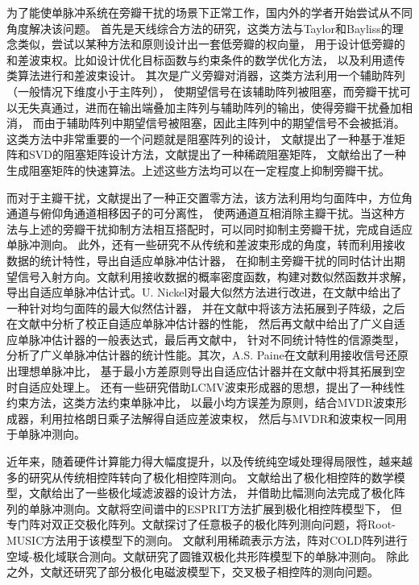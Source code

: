 \documentclass[master]{thesis-uestc}
\begin{document}
为了能使单脉冲系统在旁瓣干扰的场景下正常工作，国内外的学者开始尝试从不同角度解决该问题。
首先是天线综合方法的研究，这类方法与Taylor和Bayliss的理念类似，尝试以某种方法和原则设计出一套低旁瓣的权向量，
用于设计低旁瓣的和差波束权。比如设计优化目标函数与约束条件的数学优化方法，
以及利用遗传类算法进行和差波束设计。
其次是广义旁瓣对消器，这类方法利用一个辅助阵列（一般情况下维度小于主阵列），
使期望信号在该辅助阵列被阻塞，而旁瓣干扰可以无失真通过，进而在输出端叠加主阵列与辅助阵列的输出，使得旁瓣干扰叠加相消，
而由于辅助阵列中期望信号被阻塞，因此主阵列中的期望信号不会被抵消。这类方法中非常重要的一个问题就是阻塞阵列的设计，
文献\cite{Fernández}提出了一种基于准矩阵和SVD的阻塞矩阵设计方法，文献\cite{Markovich}提出了一种稀疏阻塞矩阵，
文献\cite{Dai}给出了一种生成阻塞矩阵的快速算法。上述这些方法均可以在一定程度上抑制旁瓣干扰。

而对于主瓣干扰，文献\cite{Yu_00,Yu_01,Yu_16}提出了一种正交置零方法，该方法利用均匀面阵中，方位角通道与俯仰角通道相移因子的可分离性，
使两通道互相消除主瓣干扰。当这种方法与上述的旁瓣干扰抑制方法相互搭配时，可以同时抑制主旁瓣干扰，完成自适应单脉冲测向。
此外，还有一些研究不从传统和差波束形成的角度，转而利用接收数据的统计特性，导出自适应单脉冲估计器，
在抑制主旁瓣干扰的同时估计出期望信号入射方向。文献\cite{Davis}利用接收数据的概率密度函数，构建对数似然函数并求解，
导出自适应单脉冲估计式。U. Nickel对最大似然方法进行改进，在文献\cite{Nickel_93}中给出了一种针对均匀面阵的最大似然估计器，
并在文献\cite{Nickel_96}中将该方法拓展到子阵级，之后在文献\cite{Nickel_99}中分析了校正自适应单脉冲估计器的性能，
然后再文献\cite{Nickel_06}中给出了广义自适应单脉冲估计器的一般表达式，最后再文献\cite{Nickel_11}中，
针对不同统计特性的信源类型，分析了广义单脉冲估计器的统计性能。其次，A.S. Paine在文献\cite{Paine}利用接收信号还原出理想单脉冲比，
基于最小方差原则导出自适应估计器并在文献\cite{Paine_00}中将其拓展到空时自适应处理上。
还有一些研究借助LCMV波束形成器的思想，提出了一种线性约束方法，这类方法约束单脉冲比，
以最小均方误差为原则，结合MVDR波束形成器，利用拉格朗日乘子法解得自适应差波束权，
然后与MVDR和波束权一同用于单脉冲测向。

近年来，随着硬件计算能力得大幅度提升，以及传统纯空域处理得局限性，越来越多的研究从传统相控阵转向了极化相控阵测向。
文献\cite{Friedlander}给出了极化相控阵的数学模型，文献\cite{Ma,Mao_07,Mao_12}给出了一些极化域滤波器的设计方法，
并借助比幅测向法完成了极化阵列的单脉冲测向。文献\cite{Li}将空间谱中的ESPRIT方法扩展到极化相控阵模型下，
但专门阵对双正交极化阵列。文献\cite{Li_04,Wong}探讨了任意极子的极化阵列测向问题，将Root-MUSIC方法用于该模型下的测向。
文献\cite{Si}利用稀疏表示方法，阵对COLD阵列进行空域-极化域联合测向。文献\cite{Gao}研究了圆锥双极化共形阵模型下的单脉冲测向。
除此之外，文献\cite{He}还研究了部分极化电磁波模型下，交叉极子相控阵的测向问题。
\end{document}
